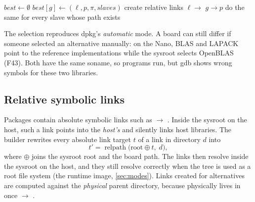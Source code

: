 \documentclass[11pt,a4paper]{article}
\newcommand{\codeb}[1]{\texttt{\detokenize{#1}}}      %
\newcommand{\finding}[1]{\textsf{\small F#1}}
\begin{document}
\begin{algorithm}[t]
\caption{Replaying \codeb{update-alternatives} (dpkg's automatic mode).}\label{alg:alternatives}
\begin{algorithmic}[1]
\State $\mathit{best} \gets \emptyset$ 
      \State $\mathit{best}[g] \gets (\ell, p, \pi, \mathit{slaves})$
    \EndIf
  \EndFor
\EndFor
{}
  \State create relative links $\ell \to$ $g \to p$
  \State do the same for every slave whose path exists
\EndFor
\end{algorithmic}
\end{algorithm}

\begin{jxbwarn}[Limitation]
The selection reproduces dpkg's \emph{automatic} mode. A board can still differ if someone selected an alternative
manually: on the Nano, BLAS and LAPACK point to the reference implementations while the sysroot selects OpenBLAS
(\finding{43}). Both have the same soname, so programs run, but gdb shows wrong symbols for these two libraries.
\end{jxbwarn}

\subsection{Relative symbolic links}
Packages contain absolute symbolic links such as
 $\to$ . Inside the sysroot on
the host, such a link points into the \emph{host's}  and silently links host libraries. The builder
rewrites every absolute link target $t$ of a link in directory $d$ into
\begin{equation}
  t' = \operatorname{relpath}\bigl(\mathrm{root} \oplus t,\; d\bigr),
\end{equation}
where $\oplus$ joins the sysroot root and the board path. The links then resolve inside the sysroot on the host, and
they still resolve correctly when the tree is used as a root file system (the runtime image, \cref{sec:modes}).
Links created for alternatives are computed against the \emph{physical} parent directory, because 
physically lives in  once  $\to$ .
\end{document}
